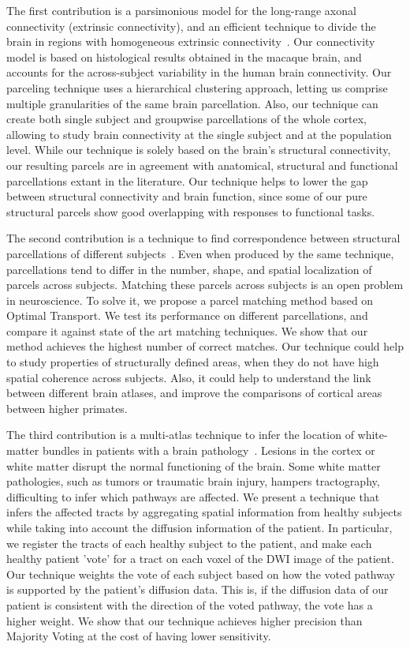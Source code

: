 The first contribution is a parsimonious model for the long-range axonal
connectivity (extrinsic connectivity), and an efficient technique to divide the
brain in regions with homogeneous extrinsic connectivity~\cite{Gallardo2017a}. Our
connectivity model is based on histological results obtained in the macaque
brain, and accounts for the across-subject variability in the human brain
connectivity. Our parceling technique uses a hierarchical clustering approach,
letting us comprise multiple granularities of the same brain parcellation.
Also, our technique can create both single subject and groupwise parcellations
of the whole cortex, allowing to study brain connectivity at the single subject
and at the population level. While our technique is solely based on the brain's
structural connectivity, our resulting parcels are in agreement with anatomical,
structural and functional parcellations extant in the literature. Our technique
helps to lower the gap between structural connectivity and brain function, since
some of our pure structural parcels show good overlapping with responses to
functional tasks.

The second contribution is a technique to find correspondence between
structural parcellations of different subjects~\cite{Gallardo2018}. Even when
produced by the same technique, parcellations tend to differ in the
number, shape, and spatial localization of parcels across subjects. Matching
these parcels across subjects is an open problem in neuroscience. To solve
it, we propose a parcel matching method based on Optimal Transport. We test its
performance on different parcellations, and compare it against state of the
art matching techniques. We show that our method achieves the highest number
of correct matches. Our technique could help to study properties of structurally
defined areas, when they do not have high spatial coherence across subjects.
Also, it could help to understand the link between different brain atlases, and
improve the comparisons of cortical areas between higher primates.

The third contribution is a multi-atlas technique to infer the location of 
white-matter bundles in patients with a brain pathology~\cite{Guillermo2018}.
Lesions in the cortex or white matter disrupt the normal functioning of the
brain. Some white matter pathologies, such as tumors or traumatic brain injury,
hampers tractography, difficulting to infer which pathways are affected. We 
present a technique that infers the affected tracts by aggregating spatial
information from healthy subjects while taking into account the diffusion
information of the patient. In particular, we register the tracts of each
healthy subject to the patient, and make each healthy patient 'vote' for a
tract on each voxel of the DWI image of the patient. Our technique weights the
vote of each subject based on how the voted pathway is supported by the patient's 
diffusion data. This is, if the diffusion data of our patient is consistent with
the direction of the voted pathway, the vote has a higher weight. We show that
our technique achieves higher precision than Majority Voting at the cost of
having lower sensitivity.

